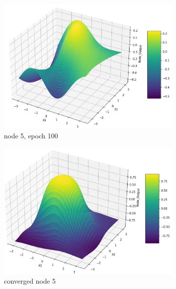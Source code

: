 \documentclass[11pt]{article}
\begin{document}
\begin{figure}[h!]
\begin{subfigure}[b]{0.45\textwidth}
	\includegraphics[scale=0.14]{hidden2_n5_e100.jpg}
	\caption{node 5, epoch 100}
	\label{fig:fig2.1.7.9}
	\end{subfigure}
	\begin{subfigure}[b]{0.45\textwidth}
	\centering
	\includegraphics[scale=0.14]{hidden2_n5_c.jpg}
	\caption{converged node 5}
	\label{fig:fig2.1.7.10}
	\end{subfigure}
	\begin{subfigure}[b]{0.3\textwidth}
	\centering

\end{subfigure}
\end{figure}
\end{document}
